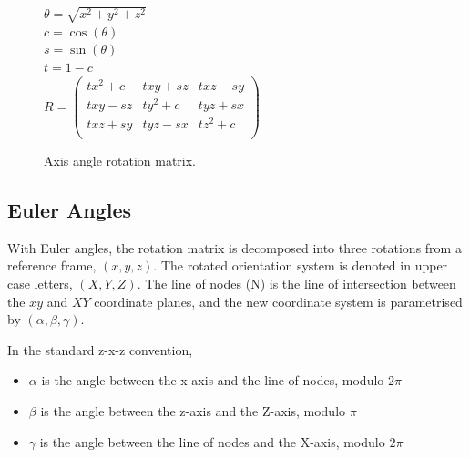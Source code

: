 \documentclass[12pt,a4,notitlepage]{report}
\renewcommand{\_}{\texttt{\symbol{95}}}
\newcommand{\<}{\texttt{\symbol{60}}}
\renewcommand{\>}{\texttt{\symbol{62}}}
\begin{document}
\begin{figure}
$\theta = \sqrt{x^2 + y^2 + z^2}$\\

$c = \cos(\theta)$\\
$s = \sin(\theta)$\\
$t = 1-c $\\

$R =
\left( \begin{array}{ccc}
      tx^2+c & txy+sz & txz-sy\\
		txy-sz & ty^2+c & tyz+sx\\
		txz+sy & tyz-sx & tz^2+c\\
\end{array} \right)$
\caption{Axis angle rotation matrix.}
\label{axisangle}
\end{figure}

\subsection{Euler Angles}

With Euler angles, the rotation matrix is decomposed into three rotations from a reference frame, $(x,y,z)$. The rotated orientation system is denoted in upper case letters, $(X,Y,Z)$. The line of nodes (N) is the line of intersection between the $xy$ and $XY$ coordinate planes, and the new coordinate system is parametrised by $(\alpha,\beta,\gamma)$.

In the standard z-x-z convention,

\begin{itemize}
\item $\alpha$ is the angle between the x-axis and the line of nodes, modulo $2\pi$
\item $\beta$ is the angle between the z-axis and the Z-axis, modulo $\pi$
\item $\gamma$ is the angle between the line of nodes and the X-axis, modulo $2\pi$
\end{itemize}
\end{document}
